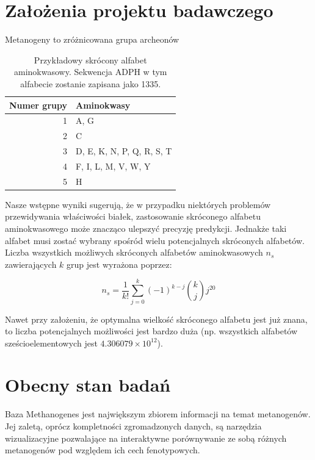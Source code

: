 \documentclass{article}
\author{Michał Burdukiewicz, Przemysław Gagat}
\title{n-gramowa analiza białek metanogenów\linebreak \vskip{} 
\large{Projekt badawczy Doktoranckiego Koła Naukowego Bioinformatyki}}
\date{}
\begin{document}
\maketitle

\section{Założenia projektu badawczego}

Metanogeny to zróżnicowana grupa archeonów


\begin{table}[ht]
\centering
\caption{Przykładowy skrócony alfabet 
aminokwasowy. Sekwencja ADPH w tym alfabecie 
zostanie zapisana jako 1335.} 
\begin{tabular}{rl}
  \toprule
Numer grupy & Aminokwasy \\ 
  \midrule
  1 & A, G \\ 
   \rowcolor[gray]{0.85}  2 & C \\ 
    3 & D, E, K, N, P, Q, R, S, T \\ 
   \rowcolor[gray]{0.85}  4 & F, I, L, M, V, W, Y \\ 
    5 & H \\ 
   \bottomrule
\end{tabular}
\label{tab:przykladowy}
\end{table}

Nasze wstępne wyniki sugerują, że w przypadku niektórych problemów 
przewidywania właściwości białek, zastosowanie skróconego alfabetu 
aminokwasowego może znacząco ulepszyć precyzję predykcji. Jednakże taki alfabet  
musi zostać wybrany spośród wielu potencjalnych skróconych alfabetów. Liczba 
wszystkich możliwych skróconych alfabetów aminokwasowych $n_s$ zawierających $k$ 
grup jest wyrażona poprzez: 

$$ n_s = \frac{1}{k!} \sum^{k}_{j = 0} (-1)^{k-j}  {k \choose j} j^{20} $$

Nawet przy założeniu, że optymalna wielkość skróconego alfabetu jest już znana, 
to liczba potencjalnych możliwości jest bardzo duża (np. wszystkich alfabetów 
sześcioelementowych jest $4.306079 \times 10^{12}$).

\section{Obecny stan badań}

Baza Methanogenes jest największym zbiorem informacji na temat 
metanogenów. Jej zaletą, oprócz kompletności zgromadzonych danych, są 
narzędzia wizualizacyjne pozwalające na interaktywne porównywanie ze 
sobą różnych metanogenów pod względem ich cech fenotypowych.
\end{document}
